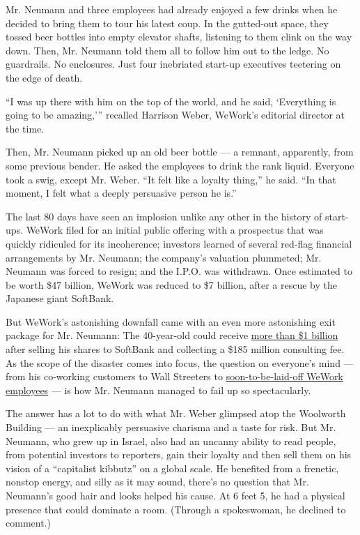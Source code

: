 Mr. Neumann and three employees had already enjoyed a few drinks when he
decided to bring them to tour his latest coup. In the gutted-out space,
they tossed beer bottles into empty elevator shafts, listening to them
clink on the way down. Then, Mr. Neumann told them all to follow him out
to the ledge. No guardrails. No enclosures. Just four inebriated
start-up executives teetering on the edge of death.

``I was up there with him on the top of the world, and he said,
`Everything is going to be amazing,''' recalled Harrison Weber, WeWork's
editorial director at the time.

Then, Mr. Neumann picked up an old beer bottle --- a remnant,
apparently, from some previous bender. He asked the employees to drink
the rank liquid. Everyone took a swig, except Mr. Weber. ``It felt like
a loyalty thing,'' he said. ``In that moment, I felt what a deeply
persuasive person he is.''

The last 80 days have seen an implosion unlike any other in the history
of start-ups. WeWork filed for an initial public offering with a
prospectus that was quickly ridiculed for its incoherence; investors
learned of several red-flag financial arrangements by Mr. Neumann; the
company's valuation plummeted; Mr. Neumann was forced to resign; and the
I.P.O. was withdrawn. Once estimated to be worth \$47 billion, WeWork
was reduced to \$7 billion, after a rescue by the Japanese giant
SoftBank.

But WeWork's astonishing downfall came with an even more astonishing
exit package for Mr. Neumann: The 40-year-old could receive
\href{https://www.nytimes3xbfgragh.onion/2019/10/22/business/dealbook/wework-softbank.html?module=inline}{more
than \$1 billion} after selling his shares to SoftBank and collecting a
\$185 million consulting fee. As the scope of the disaster comes into
focus, the question on everyone's mind --- from his co-working customers
to Wall Streeters to
\href{https://www.nytimes3xbfgragh.onion/2019/11/08/business/wework-employees-letter.html}{soon-to-be-laid-off
WeWork employees} --- is how Mr. Neumann managed to fail up so
spectacularly.

The answer has a lot to do with what Mr. Weber glimpsed atop the
Woolworth Building --- an inexplicably persuasive charisma and a taste
for risk. But Mr. Neumann, who grew up in Israel, also had an uncanny
ability to read people, from potential investors to reporters, gain
their loyalty and then sell them on his vision of a ``capitalist
kibbutz'' on a global scale. He benefited from a frenetic, nonstop
energy, and silly as it may sound, there's no question that Mr.
Neumann's good hair and looks helped his cause. At 6 feet 5, he had a
physical presence that could dominate a room. (Through a spokeswoman, he
declined to comment.)

